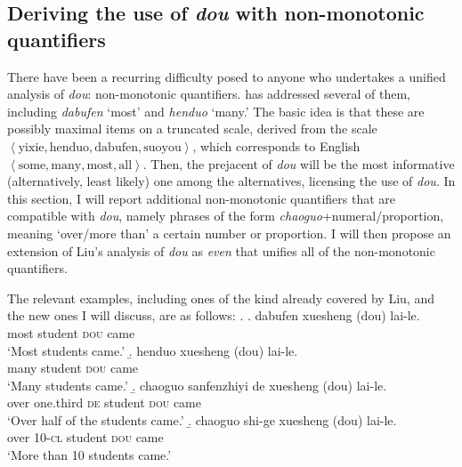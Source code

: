 \documentclass[12pt]{article}
\begin{document}
\subsection{Deriving the use of \emph{dou} with non-monotonic quantifiers}
\label{sub:non_monotonic_quantifiers}

There have been a recurring difficulty posed to anyone who undertakes a unified analysis of \emph{dou}: non-monotonic quantifiers.
\citet{liuPragmaticExplanationMeidou2021} has addressed several of them, including \emph{dabufen} `most' and \emph{henduo} `many.'
The basic idea is that these are possibly maximal items on a truncated scale, derived from the scale \(\left\langle \text{yixie}, \text{henduo}, \text{dabufen}, \text{suoyou} \right\rangle\), which corresponds to English \(\left\langle \text{some}, \text{many}, \text{most}, \text{all} \right\rangle\).
Then, the prejacent of \emph{dou} will be the most informative (alternatively, least likely) one among the alternatives, licensing the use of \emph{dou}.
In this section, I will report additional non-monotonic quantifiers that are compatible with \emph{dou}, namely phrases of the form \emph{chaoguo}+numeral/proportion, meaning `over/more than' a certain number or proportion.
I will then propose an extension of Liu's analysis of \emph{dou} as \emph{even} that unifies all of the non-monotonic quantifiers.

The relevant examples, including ones of the kind already covered by Liu, and the new ones I will discuss, are as follows:
\ex. \label{itm:non-monotonic} \a. \gll 
dabufen xuesheng (dou) lai-le. \\
most student \phantom{(}\textsc{dou} came \\
\glt `Most students came.'
\b. \gll 
henduo xuesheng (dou) lai-le. \\
many student \phantom{(}\textsc{dou} came \\
\glt `Many students came.'
\b. \gll 
chaoguo sanfenzhiyi de xuesheng (dou) lai-le. \\
over one.third \textsc{de} student \phantom{(}\textsc{dou} came \\
\glt `Over half of the students came.'
\b. \gll 
chaoguo shi-ge xuesheng (dou) lai-le. \\
over 10-\textsc{cl} student \phantom{(}\textsc{dou} came \\
\glt `More than 10 students came.'
\end{document}
